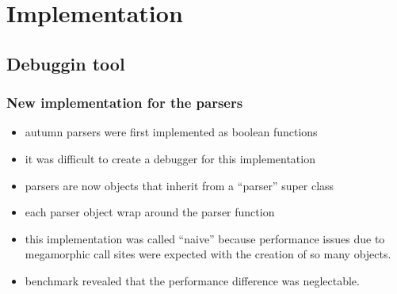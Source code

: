 %
\chapter{Implementation}


%
	\section{Debuggin tool}
%

%
		\subsection{New implementation for the parsers}
%
\begin{itemize}
	\item autumn parsers were first implemented as boolean functions
	\item it was difficult to create a debugger for this implementation
	\item parsers are now objects that inherit from a ``parser'' super class
	\item each parser object wrap around the parser function
	\item this implementation was called ``naive'' because performance issues due to megamorphic call sites were expected with the creation of so many objects.
	\item benchmark revealed that the performance difference was neglectable.
\end{itemize}
%
